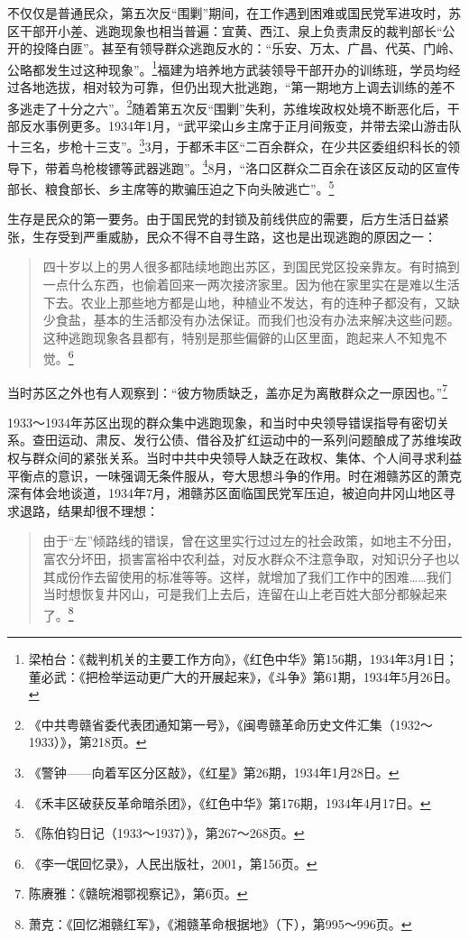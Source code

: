 不仅仅是普通民众，第五次反“围剿”期间，在工作遇到困难或国民党军进攻时，苏区干部开小差、逃跑现象也相当普遍：宜黄、西江、泉上负责肃反的裁判部长“公开的投降白匪”。甚至有领导群众逃跑反水的：“乐安、万太、广昌、代英、门岭、公略都发生过这种现象”。\footnote{梁柏台：《裁判机关的主要工作方向》，《红色中华》第156期，1934年3月1日；董必武：《把检举运动更广大的开展起来》，《斗争》第61期，1934年5月26日。}福建为培养地方武装领导干部开办的训练班，学员均经过各地选拔，相对较为可靠，但仍出现大批逃跑，“第一期地方上调去训练的差不多逃走了十分之六”。\footnote{《中共粤赣省委代表团通知第一号》，《闽粤赣革命历史文件汇集（1932～1933）》，第218页。}随着第五次反“围剿”失利，苏维埃政权处境不断恶化后，干部反水事例更多。1934年1月，“武平梁山乡主席于正月间叛变，并带去梁山游击队十三名，步枪十三支”。\footnote{《警钟——向着军区分区敲》，《红星》第26期，1934年1月28日。}3月，于都禾丰区“二百余群众，在少共区委组织科长的领导下，带着鸟枪梭镖等武器逃跑”。\footnote{《禾丰区破获反革命暗杀团》，《红色中华》第176期，1934年4月17日。}8月，“洛口区群众二百余在该区反动的区宣传部长、粮食部长、乡主席等的欺骗压迫之下向头陂逃亡”。\footnote{《陈伯钧日记（1933～1937）》，第267～268页。}


生存是民众的第一要务。由于国民党的封锁及前线供应的需要，后方生活日益紧张，生存受到严重威胁，民众不得不自寻生路，这也是出现逃跑的原因之一：

\begin{quote}

四十岁以上的男人很多都陆续地跑出苏区，到国民党区投亲靠友。有时搞到一点什么东西，也偷着回来一两次接济家里。因为他在家里实在是难以生活下去。农业上那些地方都是山地，种植业不发达，有的连种子都没有，又缺少食盐，基本的生活都没有办法保证。而我们也没有办法来解决这些问题。这种逃跑现象各县都有，特别是那些偏僻的山区里面，跑起来人不知鬼不觉。\footnote{《李一氓回忆录》，人民出版社，2001，第156页。}
\end{quote}


当时苏区之外也有人观察到：“彼方物质缺乏，盖亦足为离散群众之一原因也。”\footnote{陈赓雅：《赣皖湘鄂视察记》，第6页。}


1933～1934年苏区出现的群众集中逃跑现象，和当时中央领导错误指导有密切关系。查田运动、肃反、发行公债、借谷及扩红运动中的一系列问题酿成了苏维埃政权与群众间的紧张关系。当时中共中央领导人缺乏在政权、集体、个人间寻求利益平衡点的意识，一味强调无条件服从，夸大思想斗争的作用。时在湘赣苏区的萧克深有体会地谈道，1934年7月，湘赣苏区面临国民党军压迫，被迫向井冈山地区寻求退路，结果却很不理想：

\begin{quote}

由于“左”倾路线的错误，曾在这里实行过过左的社会政策，如地主不分田，富农分坏田，损害富裕中农利益，对反水群众不注意争取，对知识分子也以其成份作去留使用的标准等等。这样，就增加了我们工作中的困难……我们当时想恢复井冈山，可是我们上去后，连留在山上老百姓大部分都躲起来了。\footnote{萧克：《回忆湘赣红军》，《湘赣革命根据地》（下），第995～996页。}
\end{quote}


